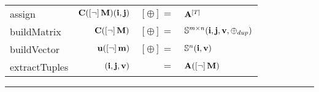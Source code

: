 {\begin{table*}[h]
\begin{center}
\begin{tabular}{l|rrl}
{\sf assign}       & ${\bf C}(\left[\neg\right]{\bf M})({\bf i},{\bf j})$ & $\left[\oplus\right]=$ & ${\bf A}^{\left[T\right]}$ \\
{\sf buildMatrix}  & ${\bf C}(\left[\neg\right]{\bf M})$ & $\left[\oplus\right]=$ & $\mathbb{S}^{m\times n}({\bf i},{\bf j},{\bf v},\oplus_{dup})$ \\
{\sf buildVector}  & ${\bf u}(\left[\neg\right]{\bf m})$ & $\left[\oplus\right]=$ & $\mathbb{S}^{n}({\bf i},{\bf v})$ \\
{\sf extractTuples}& $({\bf i},{\bf j},{\bf v})$ & $=$ & ${\bf A}(\left[\neg\right]{\bf M})$ \\
\end{tabular}
\end{center}
\hrule
\end{table*}
}

